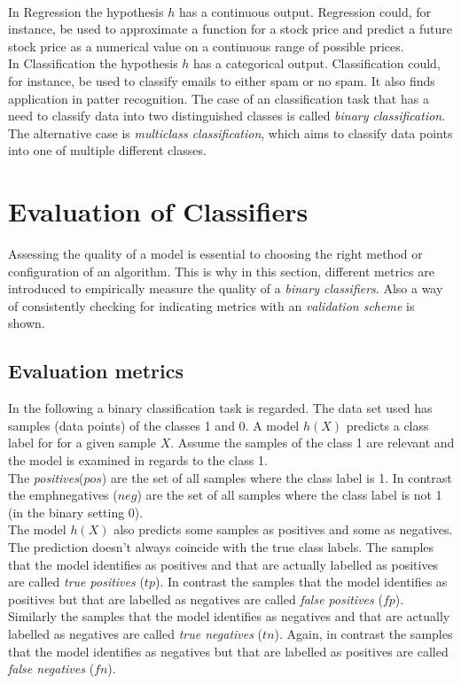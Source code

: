 \\
In Regression the hypothesis $h$ has a continuous output. Regression could, for instance, be used to approximate a function for a stock price and predict a future stock price as a numerical value on a continuous range of possible prices.
\\
In Classification the hypothesis $h$ has a categorical output. Classification could, for instance, be used to classify emails to either spam or no spam. It also finds application in patter recognition. %
The case of an classification task that has a need to classify data into two distinguished classes is called \emph{binary classification}. The alternative case is \emph{multiclass classification}, which aims to classify data points into one of multiple different classes.


\section{Evaluation of Classifiers}
Assessing the quality of a model is essential to choosing the right method or configuration of an algorithm. This is why in this section, different metrics are introduced to empirically  measure the quality of a \emph{binary classifiers}. Also a way of consistently checking for indicating metrics with an \emph{validation scheme} is shown.
\\

\subsection*{Evaluation metrics}
In the following a binary classification task is regarded. The data set used has samples (data points) of the classes 1 and 0. A model $h(X)$ predicts a class label for for a given sample $X$. Assume the samples of the class 1 are relevant and the model is examined in regards to the class 1. 
\\
The \emph{positives}($pos$) are the set of all samples where the class label is 1. In contrast the emph{negatives} ($neg$) are the set of all samples where the class label is not 1 (in the binary setting 0).
\\
The model $h(X)$ also predicts some samples as positives and some as negatives. The prediction doesn't always coincide with the true class labels. The samples that the model identifies as positives and that are actually labelled as positives are called \emph{true positives} ($tp$). In contrast the samples that the model identifies as positives but that are labelled as negatives are called \emph{false positives} ($fp$).  Similarly the samples that the model identifies as negatives and that are actually labelled as negatives are called \emph{true negatives} ($tn$). Again, in contrast the samples that the model identifies as negatives but that are labelled as positives are called \emph{false negatives} ($fn$).
\\


